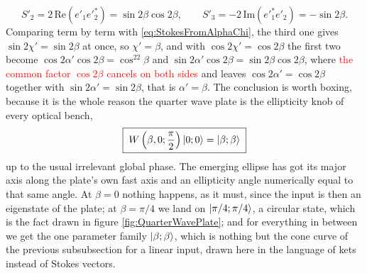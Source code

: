             \begin{equation*}
                S'_2 = 2\,\text{Re}\left(e'_1e'^{*}_2\right) = \sin2\beta\cos2\beta, \qquad S'_3 = -2\,\text{Im}\left(e'^{*}_1e'_2\right) = -\sin2\beta .
            \end{equation*}
            Comparing term by term with \ref{eq:StokesFromAlphaChi}, the third one gives $\sin2\chi'=\sin2\beta$ at once, so $\chi'=\beta$, and with $\cos2\chi'=\cos2\beta$ the first two become $\cos2\alpha'\cos2\beta=\cos^22\beta$ and $\sin2\alpha'\cos2\beta=\sin2\beta\cos2\beta$, where \textcolor{red}{the common factor $\cos2\beta$ cancels on both sides} and leaves $\cos2\alpha'=\cos2\beta$ together with $\sin2\alpha'=\sin2\beta$, that is $\alpha'=\beta$. The conclusion is worth boxing, because it is the whole reason the quarter wave plate is the ellipticity knob of every optical bench,
            \begin{equation}\label{eq:QWPonHorizontal}
                \boxed{\;W\left(\beta,0;\frac{\pi}{2}\right)\ket{0;0} = \ket{\beta;\beta}\;}
            \end{equation}
            up to the usual irrelevant global phase. The emerging ellipse has got its major axis along the plate's own fast axis and an ellipticity angle numerically equal to that same angle. At $\beta=0$ nothing happens, as it must, since the input is then an eigenstate of the plate; at $\beta=\pi/4$ we land on $\ket{\pi/4;\pi/4}$, a circular state, which is the fact drawn in figure \ref{fig:QuarterWavePlate}; and for everything in between we get the one parameter family $\ket{\beta;\beta}$, which is nothing but the cone curve of the previous subsubsection for a linear input, drawn here in the language of kets instead of Stokes vectors.

